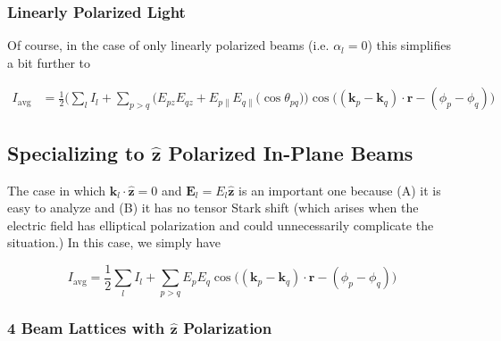 \documentclass[11pt]{article}
\newcommand{\eq}[1]{\begin{equation*} \begin{split}   #1  \end{split} \end{equation*}}
\newcommand{\para}{\parallel}
\newcommand{\alp}{\alpha}
\newcommand{\tth}{\theta}
\newcommand{\ph}{\phi}
\newcommand{\vE}{\mathbf{E}}
\newcommand{\vk}{\mathbf{k}}
\newcommand{\vr}{\mathbf{r}}
\newcommand{\vkhat}{\mathbf{\hat{k}}}
\newcommand{\vzhat}{\mathbf{\hat{z}}}
\begin{document}
\subsubsection{Linearly Polarized Light}

Of course, in the case of only linearly polarized beams (i.e. $\alp_l = 0$) this simplifies a bit further to

\begin{equation}
\begin{split}
I_\text{avg} &= \frac{1}{2} \Bigg( \sum_l I_l + \sum_{p > q} \Big(E_{pz}E_{qz} + E_{p\para}E_{q\para} \big(\cos\tth_{pq}\big)\Big) \cos\Big((\vk_p-\vk_q) \cdot \vr - (\ph_p-\ph_q)\Big)\
\end{split}
\end{equation}




%

\subsection{Specializing to $\vzhat$ Polarized In-Plane Beams}

The case in which $\vk_l \cdot \vzhat = 0$ and $\vE_l = E_l\vzhat$ is an important one because (A) it is easy to analyze and (B) it has no tensor Stark shift (which arises when the electric field has elliptical polarization and could unnecessarily complicate the situation.)  In this case, we simply have

\[
I_\text{avg} = \frac{1}{2} \sum_l I_l + \sum_{p > q} E_{p}E_{q} \cos\Big((\vk_p-\vk_q) \cdot \vr - (\ph_p-\ph_q)\Big)
\]

\subsubsection{4 Beam Lattices with $\vzhat$ Polarization}
\end{document}
